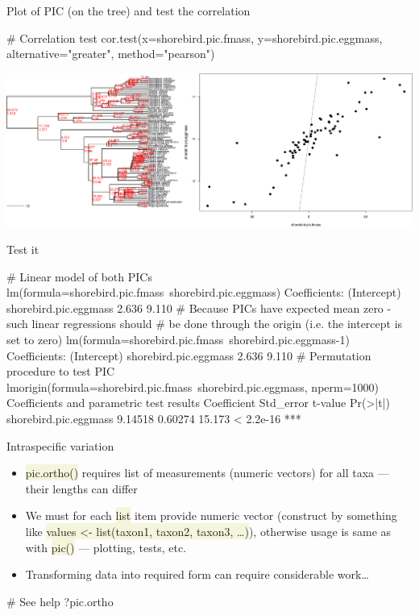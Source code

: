 \documentclass[compress, ucs, xelatex, 11pt, xcolor=svgnames, aspectratio=169,
	hyperref={
		bookmarks=true,
		unicode=true,
		colorlinks=true,
		pdftitle={Molecular data in R},
		plainpages=false,
		pdfauthor={Vojtech Zeisek},
		pdfsubject={Course about phylogeny and evolution in R},
		pdfcreator={XeLaTeX},
		pdfkeywords={R, evolution, phylogeny, molecular data},
		linkcolor=Crimson, %
		anchorcolor=Magenta, %
		citecolor=Magenta, %
		filecolor=Magenta, %
		menucolor=Magenta, %
		urlcolor=DodgerBlue, %
		pdftex},
	url={hyphens, lowtilde} %
	]{beamer}
\renewcommand{\texttt}[1]{\colorbox{Beige}{{\ttfamily #1}}}
\begin{document}
\begin{frame}[fragile]{Plot of PIC (on the tree) and test the correlation}
	\begin{spluscode}
    # Correlation test
    cor.test(x=shorebird.pic.fmass, y=shorebird.pic.eggmass,
      alternative="greater", method="pearson")
	\end{spluscode}
	\begin{center}
		\includegraphics[width=\textwidth-2cm]{pic.png}
	\end{center}
\end{frame}

\begin{frame}[fragile]{Test it}
	\label{pic-test}
	\begin{spluscode}
    # Linear model of both PICs
    lm(formula=shorebird.pic.fmass~shorebird.pic.eggmass)
    Coefficients:
          (Intercept)  shorebird.pic.eggmass
                2.636                  9.110
    # Because PICs have expected mean zero - such linear regressions should
    # be done through the origin (i.e. the intercept is set to zero)
    lm(formula=shorebird.pic.fmass~shorebird.pic.eggmass-1)
    Coefficients:
          (Intercept)  shorebird.pic.eggmass
                2.636                  9.110
    # Permutation procedure to test PIC
    lmorigin(formula=shorebird.pic.fmass~shorebird.pic.eggmass, nperm=1000)
    Coefficients and parametric test results 
                          Coefficient Std_error t-value  Pr(>|t|)
    shorebird.pic.eggmass     9.14518   0.60274  15.173 < 2.2e-16 ***
	\end{spluscode}
\end{frame}

\begin{frame}[fragile]{Intraspecific variation}
	\begin{itemize}
		\item \texttt{pic.ortho()} requires list of measurements (numeric vectors) for all taxa --- their lengths can differ
		\item We must for each \texttt{list} item provide numeric vector (construct by something like \texttt{values <- list(taxon1, taxon2, taxon3, \ldots)}), otherwise usage is same as with \texttt{pic()} --- plotting, tests, etc.
		\item Transforming data into required form can require considerable work\ldots
	\end{itemize}
	\begin{spluscode}
    # See help
    ?pic.ortho
	\end{spluscode}
\end{frame}
\end{document}

